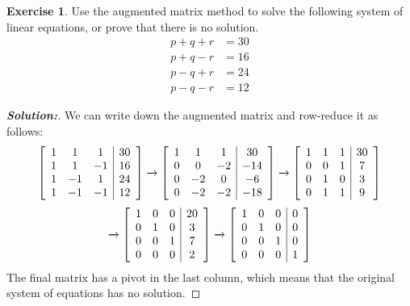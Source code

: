\documentclass[a4paper]{amsart}
\theoremstyle{definition}
\newtheorem{exercise}{Exercise}
\newenvironment{solution}{\begin{proof}[\textbf{Solution:}] \vphantom{u}}{\end{proof}}
\begin{document}
\begin{exercise}\label{ex-solve-iii}
 Use the augmented matrix method to solve the following system of
 linear equations, or prove that there is no solution.
 \begin{align*}
  p+q+r &= 30 \\
  p+q-r &= 16 \\
  p-q+r &= 24 \\
  p-q-r &= 12
 \end{align*}
\end{exercise}
\begin{solution}
 We can write down the augmented matrix and row-reduce it as follows:
 \[ 
  \left[\begin{array}{ccc|c}
    1 &  1 &  1 & 30 \\
    1 &  1 & -1 & 16 \\
    1 & -1 &  1 & 24 \\
    1 & -1 & -1 & 12
  \end{array}\right]
  \xrightarrow{}
  \left[\begin{array}{ccc|c}
    1 &  1 &  1 &  30 \\
    0 &  0 & -2 & -14 \\
    0 & -2 &  0 &  -6 \\
    0 & -2 & -2 & -18
  \end{array}\right]
  \xrightarrow{}
  \left[\begin{array}{ccc|c}
    1 &  1 &  1 &  30 \\
    0 &  0 &  1 &   7 \\
    0 &  1 &  0 &   3 \\
    0 &  1 &  1 &   9
  \end{array}\right]
 \] \[
  \xrightarrow{}
  \left[\begin{array}{ccc|c}
    1 &  0 &  0 &  20 \\
    0 &  1 &  0 &   3 \\
    0 &  0 &  1 &   7 \\
    0 &  0 &  0 &   2
  \end{array}\right]
  \xrightarrow{}
  \left[\begin{array}{ccc|c}
    1 &  0 &  0 &  0 \\
    0 &  1 &  0 &  0 \\
    0 &  0 &  1 &  0 \\
    0 &  0 &  0 &  1
  \end{array}\right]
 \]
 The final matrix has a pivot in the last column, which means that the
 original system of equations has no solution.
\end{solution}
\end{document}
